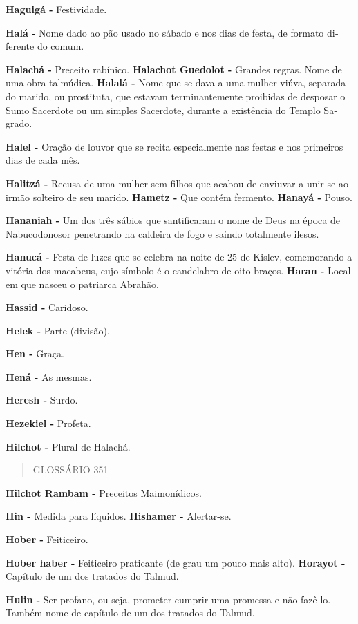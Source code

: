 \textbf{Haguigá -} Festividade.

\textbf{Halá -} Nome dado ao pão usado no sá­bado e nos dias de festa,
de formato di­ferente do comum.

\textbf{Halachá -} Preceito rabínico. \textbf{Halachot Guedolot -}
Grandes regras. Nome de uma obra talmúdica. \textbf{Halalá -} Nome que
se dava a uma mu­lher viúva, separada do marido, ou prostituta, que
estavam terminante­mente proibidas de desposar o Sumo Sacerdote ou um
simples Sacerdote, durante a existência do Templo Sa­grado.

\textbf{Halel -} Oração de louvor que se reci­ta especialmente nas
festas e nos pri­meiros dias de cada mês.

\textbf{Halitzá -} Recusa de uma mulher sem filhos que acabou de
enviuvar a unir-se ao irmão solteiro de seu marido. \textbf{Hametz -}
Que contém fermento. \textbf{Hanayá -} Pouso.

\textbf{Hananiah -} Um dos três sábios que santificaram o nome de Deus
na épo­ca de Nabucodonosor penetrando na caldeira de fogo e saindo
totalmente ilesos.

\textbf{Hanucá -} Festa de luzes que se cele­bra na noite de 25 de
Kislev, comemo­rando a vitória dos macabeus, cujo símbolo é o candelabro
de oito braços. \textbf{Haran -} Local em que nasceu o patriar­ca
Abrahão.

\textbf{Hassid -} Caridoso.

\textbf{Helek -} Parte (divisão).

\textbf{Hen -} Graça.

\textbf{Hená -} As mesmas.

\textbf{Heresh -} Surdo.

\textbf{Hezekiel -} Profeta.

\textbf{Hilchot -} Plural de Halachá.

\begin{quote}
GLOSSÁRIO 351
\end{quote}

\textbf{Hilchot Rambam -} Preceitos Maimo­nídicos.

\textbf{Hin -} Medida para líquidos. \textbf{Hishamer -} Alertar-se.

\textbf{Hober -} Feiticeiro.

\textbf{Hober haber -} Feiticeiro praticante (de grau um pouco mais
alto). \textbf{Horayot -} Capítulo de um dos trata­dos do Talmud.

\textbf{Hulin -} Ser profano, ou seja, prome­ter cumprir uma promessa e
não fazê-lo. Também nome de capítulo de um dos tratados do Talmud.

